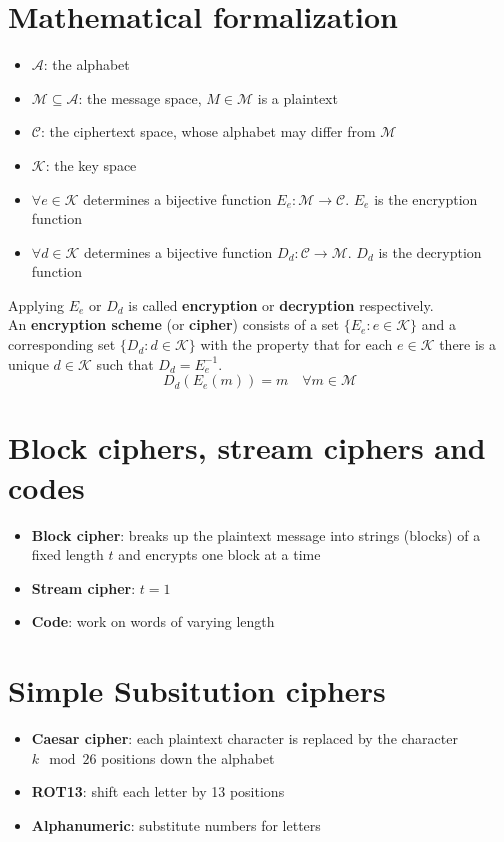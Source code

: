 \documentclass[12pt, a4paper]{report}
\begin{document}
\section{Mathematical formalization}
\begin{itemize}
    \item $\mathcal{A}$: the alphabet
    \item $\mathcal{M}\subseteq\mathcal{A}$: the message space, $M\in\mathcal{M}$ is a plaintext
    \item $\mathcal{C}$: the ciphertext space, whose alphabet may differ from $\mathcal{M}$
    \item $\mathcal{K}$: the key space
    \item $\forall e\in\mathcal{K}$ determines a bijective function $E_{e}:\mathcal{M}\rightarrow\mathcal{C}$. $E_{e}$ is the encryption function
    \item $\forall d\in\mathcal{K}$ determines a bijective function $D_{d}:\mathcal{C}\rightarrow\mathcal{M}$. $D_{d}$ is the decryption function
\end{itemize}
Applying $E_{e}$ or $D_{d}$ is called \textbf{encryption} or \textbf{decryption} respectively.\\
An \textbf{encryption scheme} (or \textbf{cipher}) consists of a set $\{E_{e}:e\in\mathcal{K}\}$ and a corresponding set $\{D_{d}:d\in\mathcal{K}\}$ with the property that for each $e\in\mathcal{K}$ there is a unique $d\in\mathcal{K}$ such that $D_{d}=E_{e}^{-1}$.
\begin{equation*}
    D_{d}(E_{e}(m))=m\quad\forall m\in\mathcal{M}
\end{equation*}
\section{Block ciphers, stream ciphers and codes}
\begin{itemize}
    \item \textbf{Block cipher}: breaks up the plaintext message into strings (blocks) of a fixed length $t$ and encrypts one block at a time
    \item \textbf{Stream cipher}: $t=1$
    \item \textbf{Code}: work on words of varying length
\end{itemize}
\section{Simple Subsitution ciphers}
\begin{itemize}
    \item \textbf{Caesar cipher}: each plaintext character is replaced by the character $k\mod 26$ positions down the alphabet
    \item \textbf{ROT13}: shift each letter by 13 positions
    \item \textbf{Alphanumeric}: substitute numbers for letters
\end{itemize}
\end{document}
